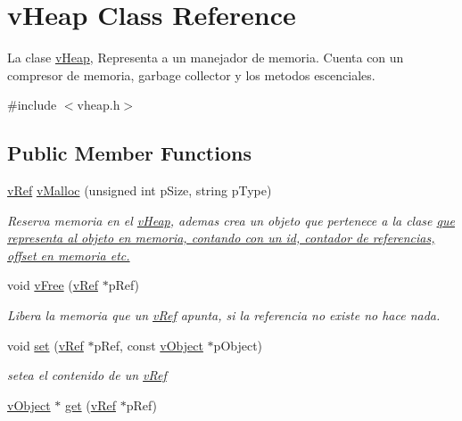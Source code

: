 \hypertarget{classv_heap}{\section{v\-Heap Class Reference}
\label{classv_heap}
}


La clase \hyperlink{classv_heap}{v\-Heap}, Representa a un manejador de memoria. Cuenta con un compresor de memoria, garbage collector y los metodos escenciales.  




{\ttfamily \#include $<$vheap.\-h$>$}

\subsection*{Public Member Functions}
\begin{DoxyCompactItemize}
\item 
\hyperlink{classv_ref}{v\-Ref} \hyperlink{classv_heap_ae4aae8ea89bc24fffed43c509fdfdc8c}{v\-Malloc} (unsigned int p\-Size, string p\-Type)
\begin{DoxyCompactList}\small\item\em Reserva memoria en el \hyperlink{classv_heap}{v\-Heap}, ademas crea un objeto que pertenece a la clase \hyperlink{class_minimalism_bit_vector}{que representa al objeto en memoria, contando con un id, contador de referencias, offset en memoria etc. }\end{DoxyCompactList}\item 
void \hyperlink{classv_heap_abb964cfa76ddee4cd1cc22dae845eed4}{v\-Free} (\hyperlink{classv_ref}{v\-Ref} $\ast$p\-Ref)
\begin{DoxyCompactList}\small\item\em Libera la memoria que un \hyperlink{classv_ref}{v\-Ref} apunta, si la referencia no existe no hace nada. \end{DoxyCompactList}\item 
void \hyperlink{classv_heap_aba09b3334fc1a732308f278c9e292484}{set} (\hyperlink{classv_ref}{v\-Ref} $\ast$p\-Ref, const \hyperlink{classv_object}{v\-Object} $\ast$p\-Object)
\begin{DoxyCompactList}\small\item\em setea el contenido de un \hyperlink{classv_ref}{v\-Ref} \end{DoxyCompactList}\item 
\hyperlink{classv_object}{v\-Object} $\ast$ \hyperlink{classv_heap_ad37c93fe08d1b15f4785a58e865f14f1}{get} (\hyperlink{classv_ref}{v\-Ref} $\ast$p\-Ref)

\end{DoxyCompactItemize}
